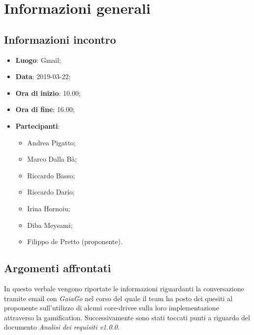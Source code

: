 \section{Informazioni generali}

\subsection{Informazioni incontro}
\begin{itemize}
\item \textbf{Luogo}: Gmail;
\item \textbf{Data}: 2019-03-22;
\item \textbf{Ora di inizio}: 10.00;
\item \textbf{Ora di fine}: 16.00;
\item \textbf{Partecipanti}: 
\begin{itemize}
	\item Andrea Pigatto;
	\item Marco Dalla Bà;
	\item Riccardo Basso;
	\item Riccardo Dario;
	\item Irina Hornoiu;
	\item Diba Meysami;
	\item Filippo de Pretto (proponente).
\end{itemize}
\end{itemize}

\subsection{Argomenti affrontati}
In questo verbale vengono riportate le informazioni riguardanti la conversazione tramite email con \textit{GaiaGo} nel corso del quale il team ha posto dei quesiti al proponente sull'utilizzo di alcuni core-drive\glosp e sulla loro implementazione attraverso la gamification\glo. Successivamente sono stati toccati punti a riguardo del documento \textit{Analisi dei requisiti v1.0.0}.
